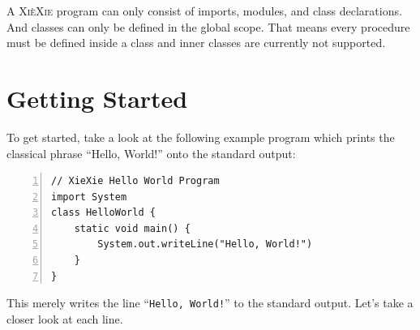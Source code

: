 \documentclass[a5paper]{report}
\def\xiexie{\textsc{Xi\`eXie}\xspace}
\begin{document}
A \xiexie program can only consist of imports, modules, and class declarations. And classes can only be defined
in the global scope. That means every procedure must be defined inside a class and inner classes are currently not supported.



\section{Getting Started}

To get started, take a look at the following example program which prints the classical phrase ``Hello, World!''
onto the standard output:
\begin{lstlisting}[numbers=left]
// XieXie Hello World Program
import System
class HelloWorld {
    static void main() {
        System.out.writeLine("Hello, World!")
    }
}
\end{lstlisting}
This merely writes the line ``\texttt{Hello, World!}'' to the standard output. Let's take a closer look at each line.
\end{document}
